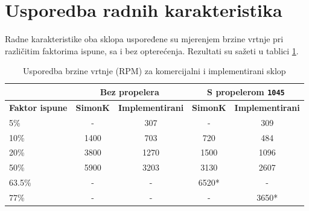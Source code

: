 \documentclass[diplomskirad, upload]{fer}
\begin{document}
\section{Usporedba radnih karakteristika}
\label{sec:usporedba_karakteristika}

Radne karakteristike oba sklopa uspoređene su mjerenjem brzine vrtnje pri
različitim faktorima ispune, sa i bez opterećenja. Rezultati su sažeti u
tablici \ref{tab:usporedba_brzina}.

\begin{table}[h!]
	\centering
	\caption{Usporedba brzine vrtnje (RPM) za komercijalni i implementirani sklop}
	\label{tab:usporedba_brzina}
	\begin{tabular}{|l|c|c|c|c|}
		\hline
		                       & \multicolumn{2}{c|}{\textbf{Bez propelera}} & \multicolumn{2}{c|}{\textbf{S propelerom \texttt{1045}}}                                             \\ \hline
		\textbf{Faktor ispune} & \textbf{SimonK}                             & \textbf{Implementirani}                                  & \textbf{SimonK} & \textbf{Implementirani} \\ \hline
		5\%                    & -                                           & \num{307}                                                & -               & \num{309}               \\ \hline
		10\%                   & \num{1400}                                  & \num{703}                                                & \num{720}       & \num{484}               \\ \hline
		20\%                   & \num{3800}                                  & \num{1270}                                               & \num{1500}      & \num{1096}              \\ \hline
		50\%                   & \num{5900}                                  & \num{3203}                                               & \num{3130}      & \num{2607}              \\ \hline
		63.5\%                 & -                                           & -                                                        & \num{6520}*     & -                       \\ \hline
		77\%                   & -                                           & -                                                        & -               & \num{3650}*             \\ \hline

\end{tabular}
\end{table}
\end{document}

